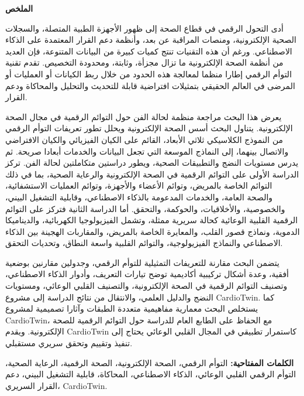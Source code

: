 \vspace*{4cm}
\begin{center}
    \begin{Arabic}
        {\Huge\bfseries الملخص}
    \end{Arabic}
\end{center}
\vskip 1cm

{}

\begin{Arabic}
أدى التحول الرقمي في قطاع الصحة إلى ظهور الأجهزة الطبية المتصلة، والسجلات الصحية الإلكترونية، ومنصات المراقبة عن بعد، وأنظمة دعم القرار المعتمدة على الذكاء الاصطناعي. ورغم أن هذه التقنيات تنتج كميات كبيرة من البيانات المتنوعة، فإن العديد من أنظمة الصحة الإلكترونية ما تزال مجزأة، وثابتة، ومحدودة التخصيص. تقدم تقنية التوأم الرقمي إطارا منظما لمعالجة هذه الحدود من خلال ربط الكيانات أو العمليات أو المرضى في العالم الحقيقي بتمثيلات افتراضية قابلة للتحديث والتحليل والمحاكاة ودعم القرار.

يعرض هذا البحث مراجعة منظمة لحالة الفن حول التوائم الرقمية في مجال الصحة الإلكترونية. يتناول البحث أسس الصحة الإلكترونية ويحلل تطور تعريفات التوأم الرقمي من النموذج الكلاسيكي ثلاثي الأبعاد، القائم على الكيان الفيزيائي والكيان الافتراضي والاتصال بينهما، إلى النماذج الموسعة التي تجعل البيانات والخدمات أبعادا صريحة. ثم يدرس مستويات النضج والتطبيقات الصحية، ويطور دراستين متكاملتين لحالة الفن. تركز الدراسة الأولى على التوائم الرقمية في الصحة الإلكترونية والرعاية الصحية، بما في ذلك التوائم الخاصة بالمريض، وتوائم الأعضاء والأجهزة، وتوائم العمليات الاستشفائية، والصحة العامة، والخدمات المدعومة بالذكاء الاصطناعي، وقابلية التشغيل البيني، والخصوصية، والأخلاقيات، والحوكمة، والتحقق. أما الدراسة الثانية فتركز على التوائم الرقمية القلبية الوعائية كحالة سريرية ممثلة، وتشمل الفيزيولوجيا الكهربائية، والديناميكا الدموية، ونماذج قصور القلب، والمعايرة الخاصة بالمريض، والمقاربات الهجينة بين الذكاء الاصطناعي والنماذج الفيزيولوجية، والتوائم القلبية واسعة النطاق، وتحديات التحقق.

يتضمن البحث مقارنة للتعريفات التمثيلية للتوأم الرقمي، وجدولين مقارنين بوضعية أفقية، وعدة أشكال تركيبية أكاديمية توضح تيارات التعريف، وأدوار الذكاء الاصطناعي، وتصنيف التوائم الرقمية في الصحة الإلكترونية، والتصنيف القلبي الوعائي، ومستويات النضج والدليل العلمي، والانتقال من نتائج الدراسة إلى مشروع CardioTwin. كما يستخلص البحث معمارية مفاهيمية متعددة الطبقات وآثارا تصميمية لمشروع CardioTwin، مع الحفاظ على الطابع العام للدراسة حول التوائم الرقمية للصحة الإلكترونية. ويقدم CardioTwin كاستمرار تطبيقي في المجال القلبي الوعائي يحتاج إلى تنفيذ وتقييم وتحقق سريري مستقبلي.

\textbf{الكلمات المفتاحية:} التوأم الرقمي، الصحة الإلكترونية، الصحة الرقمية، الرعاية الصحية، التوأم الرقمي القلبي الوعائي، الذكاء الاصطناعي، المحاكاة، قابلية التشغيل البيني، دعم القرار السريري، CardioTwin.
\end{Arabic}

\clearpage
